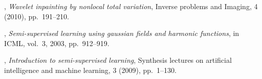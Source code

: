 \documentclass[letterpaper,10pt]{article}
\begin{document}
\begin{thebibliography}{10}
, {\em Wavelet inpainting by nonlocal total
  variation}, Inverse problems and Imaging, 4 (2010), pp.~191--210.

, {\em Semi-supervised learning
  using gaussian fields and harmonic functions}, in ICML, vol.~3, 2003,
  pp.~912--919.

, {\em Introduction to semi-supervised
  learning}, Synthesis lectures on artificial intelligence and machine
  learning, 3 (2009), pp.~1--130.

\end{thebibliography}
\end{document}
